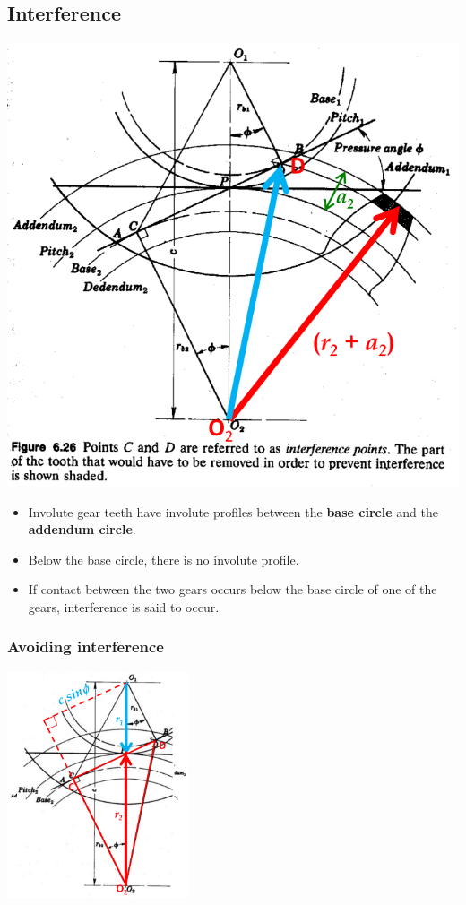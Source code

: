 \documentclass[11pt]{article}
\begin{document}
\subsection{Interference}
\label{sec:org2eb7be1}
\begin{center}
\includegraphics[width=.9\linewidth]{./images/interference-diagram.png}
\end{center}
\begin{itemize}
\item Involute gear teeth have involute profiles between the \textbf{base circle} and the \textbf{addendum circle}.
\item Below the base circle, there is no involute profile.
\item If contact between the two gears occurs below the base circle of one of the gears, interference is said to occur.
\end{itemize}
\subsubsection{Avoiding interference}
\label{sec:org6c74963}
\begin{center}
\includegraphics[height=18em]{./images/avoiding-interference-diagram.png}
\end{center}
\end{document}
